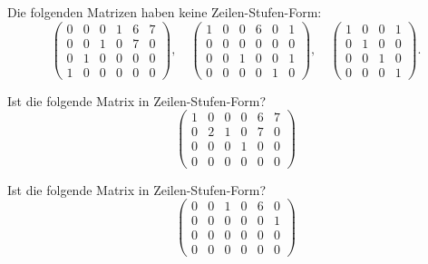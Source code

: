 \documentclass{ximera}
\begin{document}
Die folgenden Matrizen haben keine Zeilen-Stufen-Form:
\[
\left(
\begin{array}{cccccc}
0 & 0 & 0 & 1 & 6 & 7 \\
0 & 0 & 1 & 0 & 7 & 0 \\
0 & 1 & 0 & 0 & 0 & 0 \\
1 & 0 & 0 & 0 & 0 & 0 
\end{array}
\right), \quad
%
\left(
\begin{array}{ccccccc}
1 & 0 & 0 & 6 & 0 & 1 \\
0 & 0 & 0 & 0 & 0 & 0 \\
0 & 0 & 1 & 0 & 0 & 1 \\
0 & 0 & 0 & 0 & 1 & 0
\end{array}
\right), \quad
%
\left(
\begin{array}{ccccc}
1 & 0 & 0 & 1 \\
0 & 1 & 0 & 0 \\
0 & 0 & 1 & 0 \\
0 & 0 & 0 & 1 
\end{array}
\right).
\]


\begin{question}
Ist die folgende Matrix in Zeilen-Stufen-Form?
\[
\left(
\begin{array}{cccccc}
1 & 0 & 0 & 0 & 6 & 7 \\
0 & 2 & 1 & 0 & 7 & 0 \\
0 & 0 & 0 & 1 & 0 & 0 \\
0 & 0 & 0 & 0 & 0 & 0 
\end{array}
\right)
\]
\begin{solution}
\begin{multiple-choice}
\end{multiple-choice}
\end{solution}
\end{question}


\begin{question}
Ist die folgende Matrix in Zeilen-Stufen-Form?
\[
\left(
\begin{array}{cccccc}
0 & 0 & 1 & 0 & 6 & 0 \\
0 & 0 & 0 & 0 & 0 & 1 \\
0 & 0 & 0 & 0 & 0 & 0 \\
0 & 0 & 0 & 0 & 0 & 0 
\end{array}
\right)
\]
\begin{solution}
\begin{multiple-choice}
\end{multiple-choice}
\end{solution}
\end{question}
\end{document}
